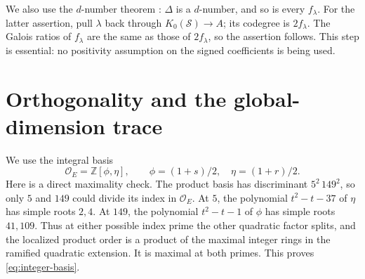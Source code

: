 \documentclass[11pt]{article}
\newcommand{\Z}{\mathbb Z}
\newcommand{\OO}{\mathcal O}
\numberwithin{equation}{section}
\begin{document}
We also use the $d$-number theorem \cite[Theorem 1.2 and Corollary 1.4]{Od}:
$\Delta$ is a $d$-number, and so is every $f_\lambda$. For the latter assertion,
pull $\lambda$ back through $K_0(\mathcal S)\to A$; its codegree is
$2f_\lambda$. The Galois ratios of $f_\lambda$ are the same as those of
$2f_\lambda$, so the assertion follows. This step is essential: no positivity
assumption on the signed coefficients is being used.

\section{Orthogonality and the global-dimension trace}
We use the integral basis
\begin{equation}\label{eq:integer-basis}
\OO_E=\Z[\phi,\eta],\qquad
\phi=(1+s)/2,\quad \eta=(1+r)/2.
\end{equation}
Here is a direct maximality check. The product basis has discriminant
$5^2\,149^2$, so only $5$ and $149$ could divide its index in $\OO_E$.
At $5$, the polynomial $t^2-t-37$ of $\eta$ has simple roots $2,4$.
At $149$, the polynomial $t^2-t-1$ of $\phi$ has simple roots $41,109$.
Thus at either possible index prime the other quadratic factor splits, and
the localized product order is a product of the maximal integer rings in the
ramified quadratic extension. It is maximal at both primes. This proves
\eqref{eq:integer-basis}.
\end{document}
